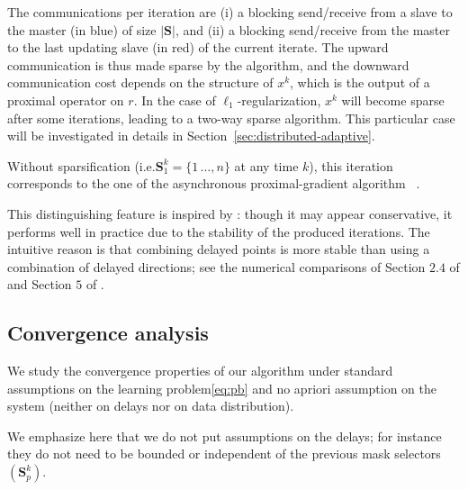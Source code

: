 The communications per iteration are (i) a blocking {\color{blue!70!black}send/receive} from a slave to the master (in {\color{blue!70!black}blue}) of size $|\mathbf{S}|$, and (ii) a blocking {\color{red!80!yellow}send/receive} from the master to the last updating slave (in {\color{red!80!yellow}red}) of the current iterate.
The upward communication is thus made sparse by the algorithm, and the downward communication cost depends on the structure of $x^k$, which is the output of a proximal operator on $r$. In the case of $\ell_1$-regularization, $x^k$ will become sparse after some iterations, leading to a two-way sparse algorithm. This particular case will be investigated in details in Section~\ref{sec:distributed-adaptive}. 



Without sparsification (i.e.\;$\mathbf{S}_1^{k}= \{1\,\ldots,n\}$ at any time $k$), this iteration corresponds to the one of the asynchronous proximal-gradient algorithm \dave~\cite{ICML18}.


This distinguishing feature is inspired by \dave: though it may appear conservative, it performs well in practice due to the stability of the produced iterations. The intuitive reason is that combining delayed points is more stable than using a combination of delayed directions; see the numerical comparisons of Section $2.4$ of \cite{mishchenko2018} and Section $5$ of \cite{ICML18}. 



\subsection{Convergence analysis}\label{sec:distributed-sparse-analyze}

We study the convergence properties of our algorithm under standard assumptions on the learning problem\;\eqref{eq:pb} and no apriori assumption on the system (neither on delays nor on data distribution).


We emphasize here that we do not put assumptions on the delays; for instance they do not need to be bounded or independent of the previous mask selectors $(\mathbf{S}_p^k)$. 

